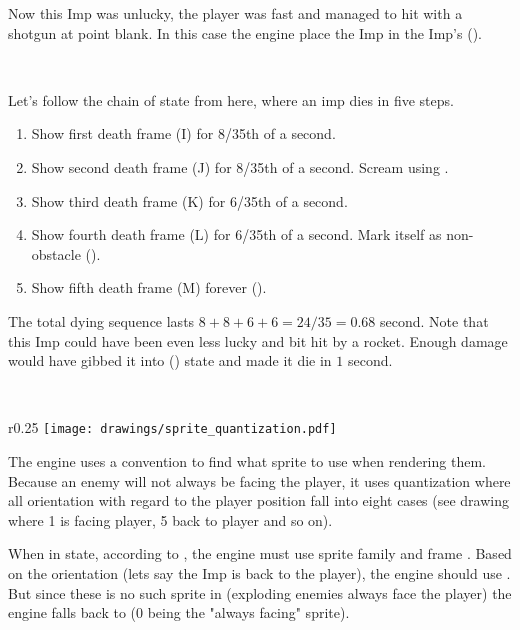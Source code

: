 Now this Imp was unlucky, the player was fast and managed to hit with a shotgun at point blank. In this case the engine place the Imp in the Imp's  ().\\
\par
{}\\
\par

\par


\pagebreak
Let's follow the chain of state from here, where an imp dies in five steps.

\begin{enumerate}
\item Show first death frame (I) for 8/35th of a second.
\item Show second death frame (J) for 8/35th of a second. Scream using .
\item Show third death frame (K) for 6/35th of a second.
\item Show fourth death frame (L) for 6/35th of a second. Mark itself as non-obstacle ().
\item Show fifth death frame (M) forever ().
\end{enumerate}
\par
The total dying sequence lasts $8+8+6+6=24/35 = 0.68$ second. Note that this Imp could have been even less lucky and bit hit by a rocket. Enough damage would have gibbed it into  () state and made it die in $1$ second.\\
\par
{}\\
\par
{}




\par
\begin{wrapfigure}[9]{r}{0.25\textwidth}
\centering
\texttt{[image: drawings/sprite\_quantization.pdf]}
\end{wrapfigure}
The engine uses a convention to find what sprite to use when rendering them. Because an enemy will not always be facing the player, it uses quantization where all orientation with regard to the player position fall into eight cases (see drawing where 1 is facing player, 5 back to player and so on).\\
\par
When in  state, according to , the engine must use sprite family  and frame . Based on the orientation (lets say the Imp is back to the player), the engine should use . But since these is no such sprite in  (exploding enemies always face the player) the engine falls back to  (0 being the "always facing" sprite).
\par







